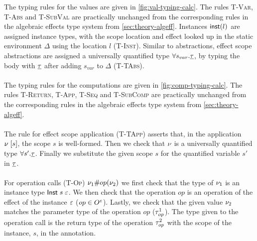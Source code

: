 {The typing rules for the values are given in \cref{fig:val-typing-calc}.
The rules \textsc{T-Var}, \textsc{T-Abs} and \textsc{T-SubVal} are practically unchanged from the corresponding rules in the algebraic effects type system from \cref{sec:theory-algeff}.
Instances $\mathsf{inst}(l)$ are assigned instance types, with the scope location and effect looked up in the static environment $\Delta$ using the location $l$ (\textsc{T-Inst}).
Similar to abstractions, effect scope abstractions are assigned a universally quantified type $\forall s_{var} . \underline{\tau}$, by typing the body with $\underline{\tau}$ after adding $s_{var}$ to $\Delta$ (\textsc{T-TAbs}).
\\\\
The typing rules for the computations are given in \cref{fig:comp-typing-calc}.
The rules \textsc{T-Return}, \textsc{T-App}, \textsc{T-Seq} and \textsc{T-SubComp} are practically unchanged from the corresponding rules in the algebraic effects type system from \cref{sec:theory-algeff}.
\\\\
The rule for effect scope application (\textsc{T-TApp}) asserts that, in the application $\nu \; [ s ]$, the scope $s$ is well-formed.
Then we check that $\nu$ is a universally quantified type $\forall s' . \underline{\tau}$.
Finally we substitute the given scope $s$ for the quantified variable $s'$ in $\underline{\tau}$.
\\\\
For operation calls (\textsc{T-Op}) $\nu_1 \# op(\nu_2)$ we first check that the type of $\nu_1$ is an instance type $\mathsf{Inst} \; s \; \varepsilon$.
We then check that the operation $op$ is an operation of the effect of the instance $\varepsilon$ ($op \in O^{\varepsilon}$).
Lastly, we check that the given value $\nu_2$ matches the parameter type of the operation $op$ ($\tau^1_{op}$).
The type given to the operation call is the return type of the operation $\tau^2_{op}$ with the scope of the instance, $s$, in the annotation.

}
